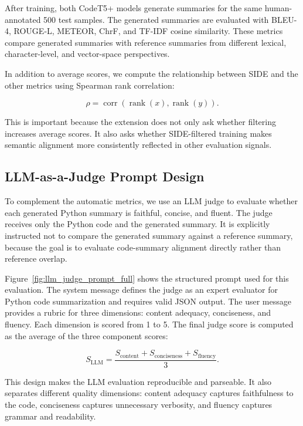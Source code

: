 After training, both CodeT5+ models generate summaries for the same human-annotated 500 test samples. The generated summaries are evaluated with BLEU-4, ROUGE-L, METEOR, ChrF, and TF-IDF cosine similarity. These metrics compare generated summaries with reference summaries from different lexical, character-level, and vector-space perspectives.

In addition to average scores, we compute the relationship between SIDE and the other metrics using Spearman rank correlation:

\[
\rho =
\operatorname{corr}
\left(
\operatorname{rank}(x),
\operatorname{rank}(y)
\right).
\]

This is important because the extension does not only ask whether filtering increases average scores. It also asks whether SIDE-filtered training makes semantic alignment more consistently reflected in other evaluation signals.

\subsection{LLM-as-a-Judge Prompt Design}

To complement the automatic metrics, we use an LLM judge to evaluate whether each generated Python summary is faithful, concise, and fluent. The judge receives only the Python code and the generated summary. It is explicitly instructed not to compare the generated summary against a reference summary, because the goal is to evaluate code-summary alignment directly rather than reference overlap.

Figure~\ref{fig:llm_judge_prompt_full} shows the structured prompt used for this evaluation. The system message defines the judge as an expert evaluator for Python code summarization and requires valid JSON output. The user message provides a rubric for three dimensions: content adequacy, conciseness, and fluency. Each dimension is scored from 1 to 5. The final judge score is computed as the average of the three component scores:

\[
S_{\text{LLM}}
=
\frac{
S_{\text{content}}
+
S_{\text{conciseness}}
+
S_{\text{fluency}}
}{3}.
\]

This design makes the LLM evaluation reproducible and parseable. It also separates different quality dimensions: content adequacy captures faithfulness to the code, conciseness captures unnecessary verbosity, and fluency captures grammar and readability.


